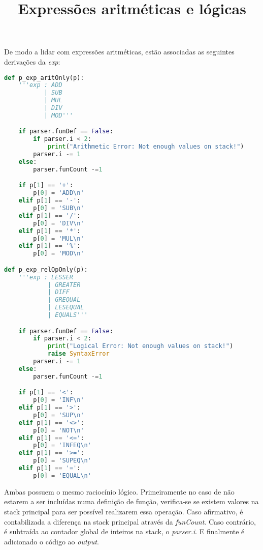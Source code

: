 \documentclass{predef}
\begin{document}
\title{Expressões aritméticas e lógicas}
De modo a lidar com expressões aritméticas, estão associadas as seguintes derivações da \textit{exp}:
\begin{lstlisting}[language=Python]
    def p_exp_aritOnly(p):
    '''exp : ADD
           | SUB
           | MUL
           | DIV
           | MOD'''

    if parser.funDef == False:
        if parser.i < 2:
            print("Arithmetic Error: Not enough values on stack!")
        parser.i -= 1
    else:
        parser.funCount -=1

    if p[1] == '+':
        p[0] = 'ADD\n'
    elif p[1] == '-':
        p[0] = 'SUB\n'
    elif p[1] == '/':
        p[0] = 'DIV\n'
    elif p[1] == '*':
        p[0] = 'MUL\n'
    elif p[1] == '%':
        p[0] = 'MOD\n'

def p_exp_relOpOnly(p):
    '''exp : LESSER
            | GREATER
            | DIFF
            | GREQUAL
            | LESEQUAL
            | EQUALS'''

    if parser.funDef == False:
        if parser.i < 2:
            print("Logical Error: Not enough values on stack!")
            raise SyntaxError
        parser.i -= 1
    else:
        parser.funCount -=1

    if p[1] == '<':
        p[0] = 'INF\n'
    elif p[1] == '>':
        p[0] = 'SUP\n'
    elif p[1] == '<>':
        p[0] = 'NOT\n'
    elif p[1] == '<=':
        p[0] = 'INFEQ\n'
    elif p[1] == '>=':
        p[0] = 'SUPEQ\n'
    elif p[1] == '=':
        p[0] = 'EQUAL\n'
\end{lstlisting}
Ambas possuem o mesmo raciocínio lógico. Primeiramente no caso de não estarem a ser incluídas numa definição de função, verifica-se se existem valores na stack principal para ser possível realizarem essa operação. Caso afirmativo, é contabilizada a diferença na stack principal através da \textit{funCount}. Caso contrário, é subtraída ao contador global de inteiros na stack, o \textit{parser.i}. E finalmente é adicionado o código ao \textit{output}.
\end{document}
